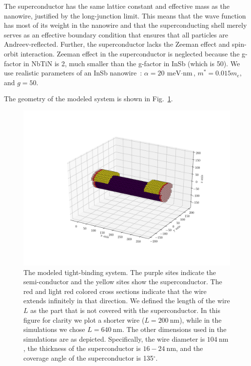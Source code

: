 \documentclass[english, aps,prb,showpacs,preprintnumber,amsmath,amssymb,superscriptaddress,reprint]{revtex4-1}
\begin{document}
The superconductor has the same lattice constant and effective mass as the nanowire, justified by the long-junction limit.
This means that the wave function has most of its weight in the nanowire and that the superconducting shell merely serves as an effective boundary condition that ensures that all particles are Andreev-reflected.
Further, the superconductor lacks the Zeeman effect and spin-orbit interaction. Zeeman effect in the superconductor is neglected because the g-factor in NbTiN is 2, much smaller than the g-factor in InSb (which is 50). 
We use realistic parameters of an InSb nanowire~\cite{mourik2012signatures}:  $\alpha=\SI{20}{\meV\cdot\nm}$, $m^{*}=0.015 m_e$, and $g=50$. 

The geometry of the modeled system is shown in Fig.~\ref{fig: system}.

\begin{figure}[!h]
\centering
\includegraphics[width=\textwidth]{figures/sup_fig6}
\caption{The modeled tight-binding system.
The purple sites indicate the semi-conductor and the yellow sites show the superconductor.
The red and light red colored cross sections indicate that the wire extends infinitely in that direction.
We defined the length of the wire $L$ as the part that is not covered with the superconductor. In this figure for clarity we plot a shorter wire ($L=\SI{200}{\nm}$), while in the simulations we chose $L=\SI{640}{\nm}$.
The other dimensions used in the simulations are as depicted. 
Specifically, the wire diameter is $\SI{104}{\nm}$, the thickness of the superconductor is $16-\SI{24}{\nm}$, and the coverage angle of the superconductor is 135$^{\circ}$.}
\label{fig: system}
\end{figure}
\end{document}
